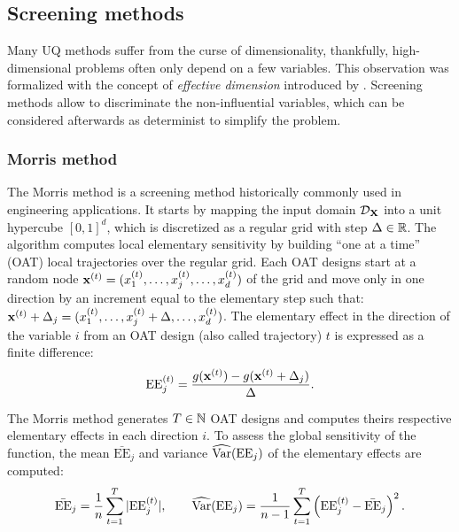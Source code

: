 \subsection{Screening methods}

Many UQ methods suffer from the curse of dimensionality, thankfully, high-dimensional problems often only depend on a few variables. 
This observation was formalized with the concept of \textit{effective dimension} introduced by \citet{owen_2003}.
Screening methods allow to discriminate the non-influential variables, which can be considered afterwards as determinist to simplify the problem.

\subsubsection{Morris method}

The Morris method \citep{morris_1991} is a screening method historically commonly used in engineering applications. 
It starts by mapping the input domain $\mathcal{D}_{{\bf X}}$ into a unit hypercube $[0, 1]^d$, which is discretized as a regular grid with step $\Delta \in \mathbb{R}$.
The algorithm computes local elementary sensitivity by building ``one at a time'' (OAT) local trajectories over the regular grid. 
Each OAT designs start at a random node ${\bf x}^{(t)} = (x^{(t)}_1, \dots, x^{(t)}_j,\dots, x^{(t)}_d)$ of the grid and move only in one direction by an increment equal to the elementary step such that: ${\bf x}^{(t)} + \Delta_j = (x^{(t)}_1, \dots, x^{(t)}_j + \Delta ,\dots, x^{(t)}_d)$. 
The elementary effect in the direction of the variable $i$ from an OAT design (also called trajectory) $t$ is expressed as a finite difference: 
\begin{equation}
    \mathrm{EE}_j^{(t)} = \frac{g({\bf x}^{(t)}) - g({\bf x}^{(t)} + \Delta_j)}{\Delta}.
    \label{eq:eeffect}
\end{equation}

The Morris method generates $T\in\mathbb{N}$ OAT designs and computes theirs respective elementary effects in each direction $i$. 
To assess the global sensitivity of the function, the mean $\bar{\mathrm{EE}}_j$ and variance $\widehat{\operatorname{Var}}(\mathrm{EE}_j)$ of the elementary effects are computed: 
\begin{equation}
    \bar{\mathrm{EE}}_j = \frac1n \sum_{t=1}^{T} |\mathrm{EE}_j^{(t)}|, \qquad 
    \widehat{\operatorname{Var}}(\mathrm{EE}_j) = \frac{1}{n-1} \sum_{t=1}^{T} \left(\mathrm{EE}_j^{(t)} - \bar{\mathrm{EE}}_j\right)^2.
\end{equation}  


